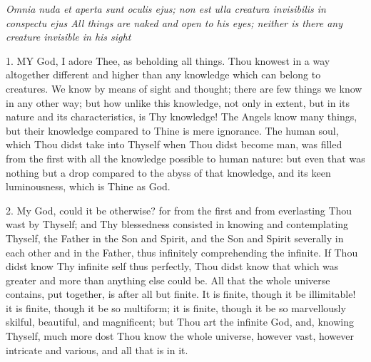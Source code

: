 
\emph{Omnia}
\emph{nuda et aperta sunt oculis ejus; non est ulla creatura invisibilis in
conspectu ejus All things are naked and open to his eyes; neither is there any creature
invisible in his sight}

1. MY
God, I adore Thee, as beholding all things. Thou knowest in a way
altogether different and higher than any knowledge which can belong to
creatures. We know by means of sight and thought; there are few things
we know in any other way; but how unlike this knowledge, not only in
extent, but in its nature and its characteristics, is Thy knowledge! The
Angels know many things, but their knowledge compared to Thine is mere
ignorance. The human soul, which Thou didst take into Thyself when Thou
didst become man, was filled from the first with all the knowledge
possible to human nature: but even that was nothing but a drop compared
to the abyss of that knowledge, and its keen luminousness, which is
Thine as God.

2. My God, could it be
otherwise? for from the first and from everlasting Thou wast by Thyself;
and Thy blessedness consisted in knowing and contemplating Thyself, the Father in the Son and Spirit, and the Son and Spirit
severally in each other and in the Father, thus infinitely comprehending
the infinite. If Thou didst know Thy infinite self thus perfectly, Thou
didst know that which was greater and more than anything else could be.
All that the whole universe contains, put together, is after all but
finite. It is finite, though it be illimitable! it is finite, though it
be so multiform; it is finite, though it be so marvellously skilful,
beautiful, and magnificent; but Thou art the infinite God, and, knowing
Thyself, much more dost Thou know the whole universe, however vast,
however intricate and various, and all that is in it.

